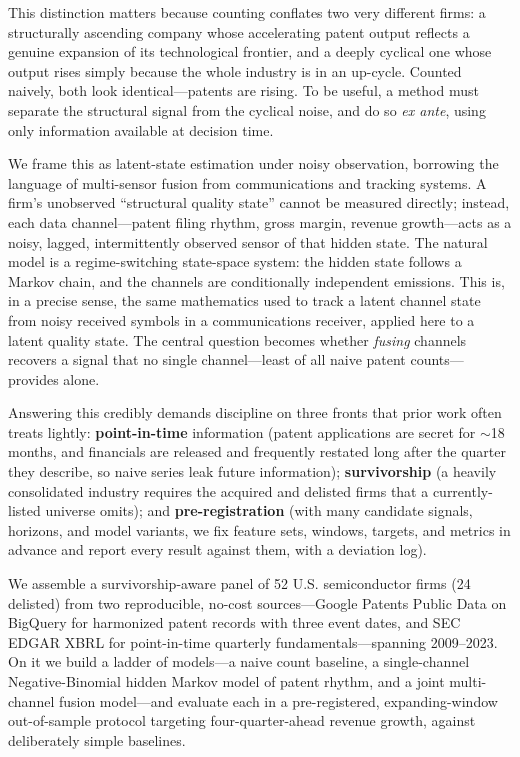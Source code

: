\documentclass[11pt]{article}
\begin{document}
This distinction matters because counting conflates two very different firms: a structurally ascending company whose accelerating patent output reflects a genuine expansion of its technological frontier, and a deeply cyclical one whose output rises simply because the whole industry is in an up-cycle. Counted naively, both look identical---patents are rising. To be useful, a method must separate the structural signal from the cyclical noise, and do so \emph{ex ante}, using only information available at decision time.

We frame this as latent-state estimation under noisy observation, borrowing the language of multi-sensor fusion from communications and tracking systems. A firm's unobserved ``structural quality state'' cannot be measured directly; instead, each data channel---patent filing rhythm, gross margin, revenue growth---acts as a noisy, lagged, intermittently observed sensor of that hidden state. The natural model is a regime-switching state-space system: the hidden state follows a Markov chain, and the channels are conditionally independent emissions. This is, in a precise sense, the same mathematics used to track a latent channel state from noisy received symbols in a communications receiver, applied here to a latent quality state. The central question becomes whether \emph{fusing} channels recovers a signal that no single channel---least of all naive patent counts---provides alone.

Answering this credibly demands discipline on three fronts that prior work often treats lightly: \textbf{point-in-time} information (patent applications are secret for $\sim$18 months, and financials are released and frequently restated long after the quarter they describe, so naive series leak future information); \textbf{survivorship} (a heavily consolidated industry requires the acquired and delisted firms that a currently-listed universe omits); and \textbf{pre-registration} (with many candidate signals, horizons, and model variants, we fix feature sets, windows, targets, and metrics in advance and report every result against them, with a deviation log).

We assemble a survivorship-aware panel of 52 U.S. semiconductor firms (24 delisted) from two reproducible, no-cost sources---Google Patents Public Data on BigQuery for harmonized patent records with three event dates, and SEC EDGAR XBRL for point-in-time quarterly fundamentals---spanning 2009--2023. On it we build a ladder of models---a naive count baseline, a single-channel Negative-Binomial hidden Markov model of patent rhythm, and a joint multi-channel fusion model---and evaluate each in a pre-registered, expanding-window out-of-sample protocol targeting four-quarter-ahead revenue growth, against deliberately simple baselines.
\end{document}
